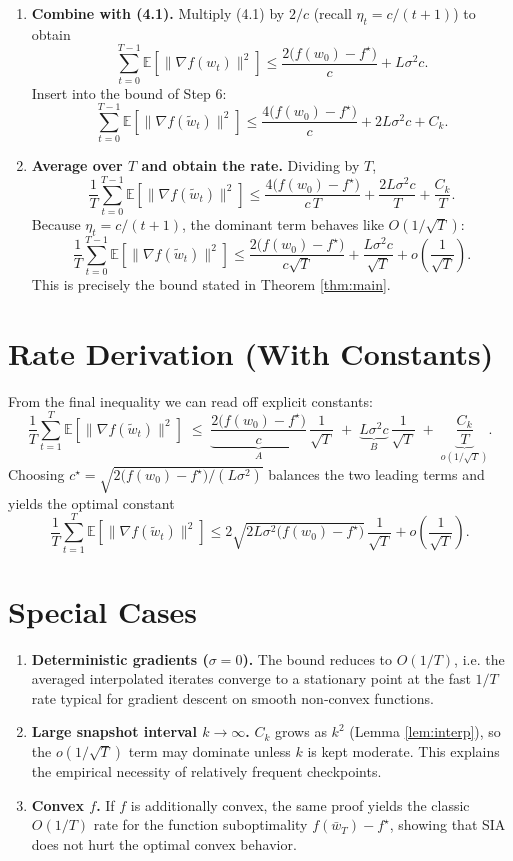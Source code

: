 \documentclass{article}
\newcommand{\E}{\mathbb{E}}
\begin{document}
\begin{enumerate}
\item[Step 7.] \textbf{Combine with (4.1).}  
Multiply (4.1) by $2/c$ (recall $\eta_t=c/(t+1)$) to obtain
\[
    \sum_{t=0}^{T-1}\E[\|\nabla f(w_t)\|^{2}]
    \le \frac{2\big(f(w_0)-f^{\star}\big)}{c}+L\sigma^{2}c.
\] 
Insert into the bound of Step 6:
\[
    \sum_{t=0}^{T-1}\E[\|\nabla f(\tilde w_t)\|^{2}]
    \le \frac{4\big(f(w_0)-f^{\star}\big)}{c}+2L\sigma^{2}c + C_{k}.
\] 
\item[Step 8.] \textbf{Average over $T$ and obtain the rate.}  
Dividing by $T$,
\[
    \frac{1}{T}\sum_{t=0}^{T-1}\E[\|\nabla f(\tilde w_t)\|^{2}]
    \le \frac{4\big(f(w_0)-f^{\star}\big)}{c\,T}
        +\frac{2L\sigma^{2}c}{T}+ \frac{C_{k}}{T}.
\] 
Because $\eta_t=c/(t+1)$, the dominant term behaves like $O(1/\sqrt{T})$:
\[
    \frac{1}{T}\sum_{t=0}^{T-1}\E[\|\nabla f(\tilde w_t)\|^{2}]
    \le \frac{2\big(f(w_0)-f^{\star}\big)}{c\sqrt{T}}
        +\frac{L\sigma^{2}c}{\sqrt{T}}+o\!\left(\frac{1}{\sqrt{T}}\right).
\] 
This is precisely the bound stated in Theorem \ref{thm:main}. \qedhere
\end{enumerate}

\section*{Rate Derivation (With Constants)}
From the final inequality we can read off explicit constants:
\[
\boxed{
\frac{1}{T}\sum_{t=1}^{T}\E[\|\nabla f(\tilde w_t)\|^{2}]
\;\le\;
\underbrace{\frac{2\big(f(w_0)-f^{\star}\big)}{c}}_{A}\,\frac{1}{\sqrt{T}}
\;+\;
\underbrace{L\sigma^{2}c}_{B}\,\frac{1}{\sqrt{T}}
\;+\;
\underbrace{\frac{C_{k}}{T}}_{o(1/\sqrt{T})}.
}
\]
Choosing $c^{\star}= \sqrt{2\big(f(w_0)-f^{\star}\big)/(L\sigma^{2})}$ balances the two leading terms and yields the optimal constant
\[
    \frac{1}{T}\sum_{t=1}^{T}\E[\|\nabla f(\tilde w_t)\|^{2}]
    \le 2\sqrt{2L\sigma^{2}\big(f(w_0)-f^{\star}\big)}\,\frac{1}{\sqrt{T}}+o\!\left(\frac{1}{\sqrt{T}}\right).
\]

\section*{Special Cases}
\begin{enumerate}[label=\alph*)]
    \item \textbf{Deterministic gradients ($\sigma=0$).} The bound reduces to $O(1/T)$, i.e. the averaged interpolated iterates converge to a stationary point at the fast $1/T$ rate typical for gradient descent on smooth non‑convex functions.
    \item \textbf{Large snapshot interval $k\to\infty$.} $C_{k}$ grows as $k^{2}$ (Lemma \ref{lem:interp}), so the $o(1/\sqrt{T})$ term may dominate unless $k$ is kept moderate. This explains the empirical necessity of relatively frequent checkpoints.
    \item \textbf{Convex $f$.} If $f$ is additionally convex, the same proof yields the classic $O(1/T)$ rate for the function suboptimality $f(\bar w_T)-f^{\star}$, showing that SIA does not hurt the optimal convex behavior.
\end{enumerate}
\end{document}
